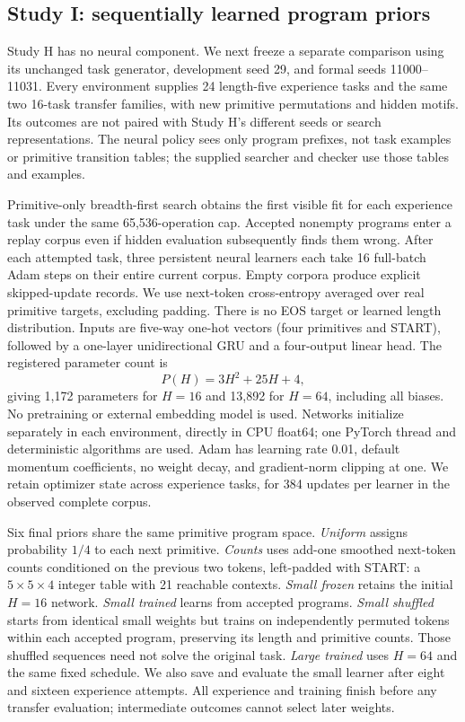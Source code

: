 \documentclass[11pt]{article}
\begin{document}
\subsection{Study I: sequentially learned program priors}
Study H has no neural component. We next freeze a separate comparison using
its unchanged task generator, development seed 29, and formal seeds
11000--11031. Every environment supplies 24 length-five experience tasks and
the same two 16-task transfer families, with new primitive permutations and
hidden motifs. Its outcomes are not paired with Study H's different seeds
or search representations. The neural policy sees only program prefixes,
not task examples or primitive transition tables; the supplied searcher and
checker use those tables and examples.

Primitive-only breadth-first search obtains the first visible fit for each
experience task under the same 65,536-operation cap. Accepted nonempty
programs enter a replay corpus even if hidden evaluation subsequently finds
them wrong. After each attempted task, three persistent neural learners each
take 16 full-batch Adam steps on their entire current corpus. Empty corpora
produce explicit skipped-update records. We use next-token cross-entropy
averaged over real primitive targets, excluding padding. There is no EOS
target or learned length distribution. Inputs are five-way one-hot vectors
(four primitives and START), followed by a one-layer unidirectional GRU and
a four-output linear head. The registered parameter count is
\[
 P(H)=3H^2+25H+4,
\]
giving 1,172 parameters for $H=16$ and 13,892 for $H=64$, including all biases.
No pretraining or external embedding model is used. Networks initialize
separately in each environment, directly in CPU float64; one PyTorch thread and deterministic algorithms are
used. Adam has learning rate 0.01, default momentum coefficients, no weight
decay, and gradient-norm clipping at one. We retain optimizer state across
experience tasks, for 384 updates per learner in the observed complete corpus.

Six final priors share the same primitive program space. \emph{Uniform}
assigns probability $1/4$ to each next primitive. \emph{Counts} uses add-one
smoothed next-token counts conditioned on the previous two tokens, left-padded
with START: a $5\times5\times4$ integer table with 21 reachable contexts.
\emph{Small frozen} retains the initial $H=16$ network. \emph{Small trained}
learns from accepted programs. \emph{Small shuffled} starts from identical
small weights but trains on independently permuted tokens within each accepted
program, preserving its length and primitive counts. Those shuffled sequences
need not solve the original task. \emph{Large trained} uses $H=64$ and the
same fixed schedule. We also save and evaluate the small learner after eight
and sixteen experience attempts. All experience and training finish before
any transfer evaluation; intermediate outcomes cannot select later weights.
\end{document}
